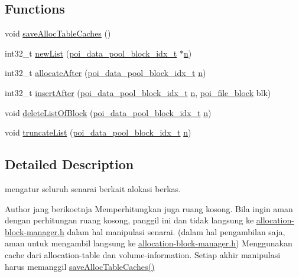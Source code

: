 \subsection*{Functions}
\begin{DoxyCompactItemize}
\item 
void \hyperlink{allocation-table_8h_a20af25d3b441d1f25e4830ee2173480c}{save\-Alloc\-Table\-Caches} ()
\item 
int32\-\_\-t \hyperlink{allocation-table_8h_ada2e09277dd8e97a2b2b75484b738126}{new\-List} (\hyperlink{data-pool-block-manager_8h_a87e19ab8290bcd76be1c7db1e90cc6f6}{poi\-\_\-data\-\_\-pool\-\_\-block\-\_\-idx\-\_\-t} $\ast$\hyperlink{allocation-table-test_8c_a24010dade8ebab3f87a48022772cd975}{n})
\item 
int32\-\_\-t \hyperlink{allocation-table_8h_a89ea9558bd50decb1bbbf85e569fe6c5}{allocate\-After} (\hyperlink{data-pool-block-manager_8h_a87e19ab8290bcd76be1c7db1e90cc6f6}{poi\-\_\-data\-\_\-pool\-\_\-block\-\_\-idx\-\_\-t} \hyperlink{allocation-table-test_8c_a24010dade8ebab3f87a48022772cd975}{n})
\item 
int32\-\_\-t \hyperlink{allocation-table_8h_a6de48f9bdf37e8005b9973a75d07633a}{insert\-After} (\hyperlink{data-pool-block-manager_8h_a87e19ab8290bcd76be1c7db1e90cc6f6}{poi\-\_\-data\-\_\-pool\-\_\-block\-\_\-idx\-\_\-t} \hyperlink{allocation-table-test_8c_a24010dade8ebab3f87a48022772cd975}{n}, \hyperlink{structpoi__file__block}{poi\-\_\-file\-\_\-block} blk)
\item 
void \hyperlink{allocation-table_8h_a8d703df55ad80bb8fb1177a0542065b6}{delete\-List\-Of\-Block} (\hyperlink{data-pool-block-manager_8h_a87e19ab8290bcd76be1c7db1e90cc6f6}{poi\-\_\-data\-\_\-pool\-\_\-block\-\_\-idx\-\_\-t} \hyperlink{allocation-table-test_8c_a24010dade8ebab3f87a48022772cd975}{n})
\item 
void \hyperlink{allocation-table_8h_a986965542b07562f2f205f9d68043a9c}{truncate\-List} (\hyperlink{data-pool-block-manager_8h_a87e19ab8290bcd76be1c7db1e90cc6f6}{poi\-\_\-data\-\_\-pool\-\_\-block\-\_\-idx\-\_\-t} \hyperlink{allocation-table-test_8c_a24010dade8ebab3f87a48022772cd975}{n})
\end{DoxyCompactItemize}


\subsection{Detailed Description}
mengatur seluruh senarai berkait alokasi berkas. \begin{DoxyAuthor}{Author}
jang berikoetnja Memperhitungkan juga ruang kosong. Bila ingin aman dengan perhitungan ruang kosong, panggil ini dan tidak langsung ke \hyperlink{allocation-block-manager_8h}{allocation-\/block-\/manager.\-h} dalam hal manipulasi senarai. (dalam hal pengambilan saja, aman untuk mengambil langsung ke \hyperlink{allocation-block-manager_8h}{allocation-\/block-\/manager.\-h}) Menggunakan cache dari allocation-\/table dan volume-\/information. Setiap akhir manipulasi harus memanggil \hyperlink{allocation-table_8h_a20af25d3b441d1f25e4830ee2173480c}{save\-Alloc\-Table\-Caches()} 
\end{DoxyAuthor}


